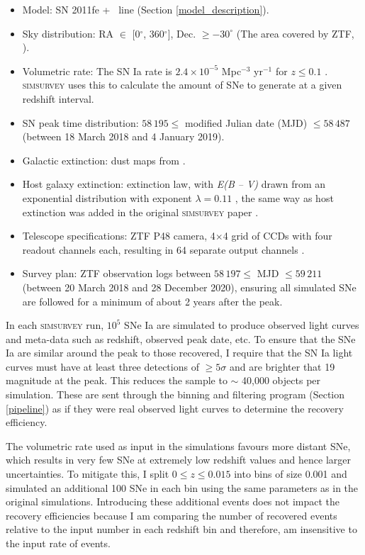 \documentclass[a4paper,oneside,12pt, class=Latex/Classes/PhDthesisPSnPDF, crop=false]{standalone}
\begin{document}
\begin{itemize}
 \item Model: SN 2011fe + \Halpha~line (Section \ref{model_description}).
 \item Sky distribution: RA $\in$ [0$^{\circ}$, 360$^{\circ}$], Dec. $\geq -30^{\circ}$ (The area covered by ZTF, \citealt{ZTF_Surveys_Scheduler}).
 \item Volumetric rate: The SN Ia rate is $2.4\times10^{-5}$ Mpc$^{-3}$ yr$^{-1}$ for $z \leq 0.1$ \citep{SNIa_rate}. \textsc{simsurvey} uses this to calculate the amount of SNe to generate at a given redshift interval.
 \item SN peak time distribution: $58\,195 \leq$ modified Julian date (MJD) $\leq 58\,487$ (between 18 March 2018 and 4 January 2019).
 \item Galactic extinction: dust maps from \citet{SFD98_dust_maps}.
 \item Host galaxy extinction: \citet{ccm89_extinction_law} extinction law, with \textit{E(B -- V)} drawn from an exponential distribution with exponent $\lambda=0.11$ \citep{EBV_simsurvey}, the same way as host extinction was added in the original \textsc{simsurvey} paper \citep{simsurvey_main}.
 \item Telescope specifications: ZTF P48 camera, 4$\times$4 grid of CCDs with four readout channels each, resulting in 64 separate output channels \citep{ZTF_Observing_System}.
 \item Survey plan: ZTF observation logs between $58\,197\leq$ MJD $\leq 59\,211$ (between 20 March 2018 and 28 December 2020), ensuring all simulated SNe are followed for a minimum of about 2 years after the peak.
\end{itemize}

In each \textsc{simsurvey} run, $10^5$ SNe Ia are simulated to produce observed light curves and meta-data such as redshift, observed peak date, etc. To ensure that the SNe Ia are similar around the peak to those recovered, I require that the SN Ia light curves must have at least three detections of $\geq5\sigma$ and are brighter that 19 magnitude at the peak. This reduces the sample to $\sim$ 40,000 objects per simulation. These are sent through the binning and filtering program (Section \ref{pipeline}) as if they were real observed light curves to determine the recovery efficiency.

The volumetric rate used as input in the simulations favours more distant SNe, which results in very few SNe at extremely low redshift values and hence larger uncertainties. To mitigate this, I split $0\leq z\leq 0.015$ into bins of size 0.001 and simulated an additional 100 SNe in each bin using the same parameters as in the original simulations. Introducing these additional events does not impact the recovery efficiencies because I am comparing the number of recovered events relative to the input number in each redshift bin and therefore, am insensitive to the input rate of events.
\end{document}

